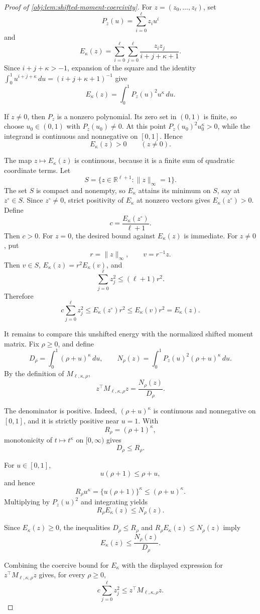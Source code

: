 \begin{proof}[Proof of \cref{obj:lem:shifted-moment-coercivity}]
For \(z=(z_0,\ldots,z_\ell)\), set
\[
P_z(u)=\sum_{i=0}^{\ell}z_i u^i
\]
and
\[
E_\kappa(z)
=
\sum_{i=0}^{\ell}\sum_{j=0}^{\ell}
\frac{z_i z_j}{i+j+\kappa+1}.
\]
Since \(i+j+\kappa>-1\), expansion of the square and the identity
\(\int_0^1 u^{i+j+\kappa}\,du=(i+j+\kappa+1)^{-1}\) give
\[
E_\kappa(z)
=
\int_0^1 P_z(u)^2u^\kappa\,du .
\] %

If \(z\ne0\), then \(P_z\) is a nonzero polynomial. Its zero set in \((0,1)\) is finite, so choose \(u_0\in(0,1)\) with \(P_z(u_0)\ne0\). At this point
\(P_z(u_0)^2u_0^\kappa>0\), while the integrand is continuous and nonnegative on \([0,1]\). Hence
\[
E_\kappa(z)>0
\qquad (z\ne0).
\] %

The map \(z\mapsto E_\kappa(z)\) is continuous, because it is a finite sum of quadratic coordinate terms. Let
\[
S=\{z\in\mathbb R^{\ell+1}:\|z\|_\infty=1\}.
\]
The set \(S\) is compact and nonempty, so \(E_\kappa\) attains its minimum on \(S\), say at \(z^\circ\in S\). Since \(z^\circ\ne0\), strict positivity of \(E_\kappa\) at nonzero vectors gives \(E_\kappa(z^\circ)>0\). Define
\[
c=\frac{E_\kappa(z^\circ)}{\ell+1}.
\]
Then \(c>0\). For \(z=0\), the desired bound against \(E_\kappa(z)\) is immediate. For \(z\ne0\), put
\[
r=\|z\|_\infty,
\qquad
v=r^{-1}z .
\]
Then \(v\in S\), \(E_\kappa(z)=r^2E_\kappa(v)\), and
\[
\sum_{j=0}^{\ell}z_j^2\le(\ell+1)r^2.
\]
Therefore
\[
c\sum_{j=0}^{\ell}z_j^2
\le
E_\kappa(z^\circ)r^2
\le
E_\kappa(v)r^2
=
E_\kappa(z).
\] %

It remains to compare this unshifted energy with the normalized shifted moment matrix. Fix \(\rho\ge0\), and define
\[
D_\rho=\int_0^1(\rho+u)^\kappa\,du,
\qquad
N_\rho(z)=\int_0^1P_z(u)^2(\rho+u)^\kappa\,du .
\]
By the definition of \(M_{\ell,\kappa,\rho}\),
\[
z^\top M_{\ell,\kappa,\rho}z
=
\frac{N_\rho(z)}{D_\rho}.
\] %

The denominator is positive. Indeed, \((\rho+u)^\kappa\) is continuous and nonnegative on \([0,1]\), and it is strictly positive near \(u=1\). With
\[
R_\rho=(\rho+1)^\kappa,
\]
monotonicity of \(t\mapsto t^\kappa\) on \([0,\infty)\) gives
\[
D_\rho\le R_\rho .
\] %

For \(u\in[0,1]\),
\[
u(\rho+1)\le \rho+u,
\]
and hence
\[
R_\rho u^\kappa
=
\{u(\rho+1)\}^\kappa
\le
(\rho+u)^\kappa .
\]
Multiplying by \(P_z(u)^2\) and integrating yields
\[
R_\rho E_\kappa(z)
\le
N_\rho(z).
\] %

Since \(E_\kappa(z)\ge0\), the inequalities \(D_\rho\le R_\rho\) and
\(R_\rho E_\kappa(z)\le N_\rho(z)\) imply
\[
E_\kappa(z)\le \frac{N_\rho(z)}{D_\rho}.
\] %

Combining the coercive bound for \(E_\kappa\) with the displayed expression for
\(z^\top M_{\ell,\kappa,\rho}z\) gives, for every \(\rho\ge0\),
\[
c\sum_{j=0}^{\ell}z_j^2
\le
z^\top M_{\ell,\kappa,\rho}z .
\] %
\end{proof}
